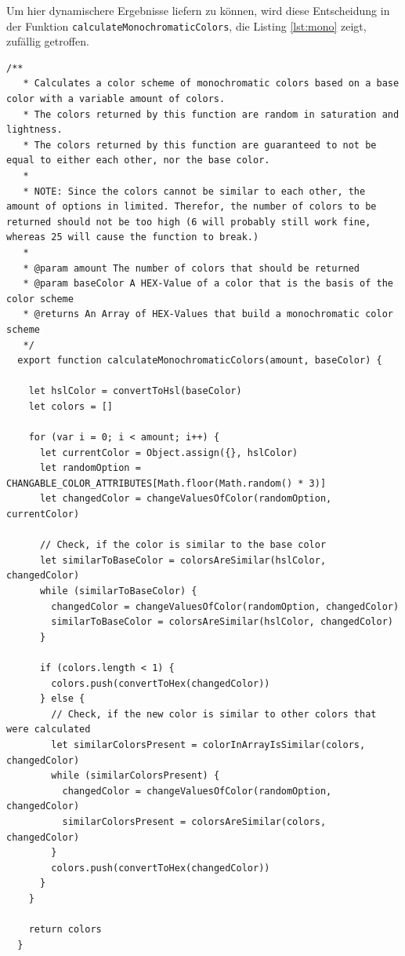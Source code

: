 Um hier dynamischere Ergebnisse liefern zu können, wird diese Entscheidung in der Funktion \verb|calculateMonochromaticColors|, die Listing \ref{lst:mono} zeigt, zufällig getroffen.

\begin{lstlisting}[caption=Berechnung eines Monochromatischen Farbschemas, label=lst:mono]
  /**
   * Calculates a color scheme of monochromatic colors based on a base color with a variable amount of colors.
   * The colors returned by this function are random in saturation and lightness.
   * The colors returned by this function are guaranteed to not be equal to either each other, nor the base color.
   *
   * NOTE: Since the colors cannot be similar to each other, the amount of options in limited. Therefor, the number of colors to be returned should not be too high (6 will probably still work fine, whereas 25 will cause the function to break.)
   *
   * @param amount The number of colors that should be returned
   * @param baseColor A HEX-Value of a color that is the basis of the color scheme
   * @returns An Array of HEX-Values that build a monochromatic color scheme
   */
  export function calculateMonochromaticColors(amount, baseColor) {

    let hslColor = convertToHsl(baseColor)
    let colors = []

    for (var i = 0; i < amount; i++) {
      let currentColor = Object.assign({}, hslColor)
      let randomOption = CHANGABLE_COLOR_ATTRIBUTES[Math.floor(Math.random() * 3)]
      let changedColor = changeValuesOfColor(randomOption, currentColor)

      // Check, if the color is similar to the base color
      let similarToBaseColor = colorsAreSimilar(hslColor, changedColor)
      while (similarToBaseColor) {
        changedColor = changeValuesOfColor(randomOption, changedColor)
        similarToBaseColor = colorsAreSimilar(hslColor, changedColor)
      }

      if (colors.length < 1) {
        colors.push(convertToHex(changedColor))
      } else {
        // Check, if the new color is similar to other colors that were calculated
        let similarColorsPresent = colorInArrayIsSimilar(colors, changedColor)
        while (similarColorsPresent) {
          changedColor = changeValuesOfColor(randomOption, changedColor)
          similarColorsPresent = colorsAreSimilar(colors, changedColor)
        }
        colors.push(convertToHex(changedColor))
      }
    }

    return colors
  }
\end{lstlisting}

